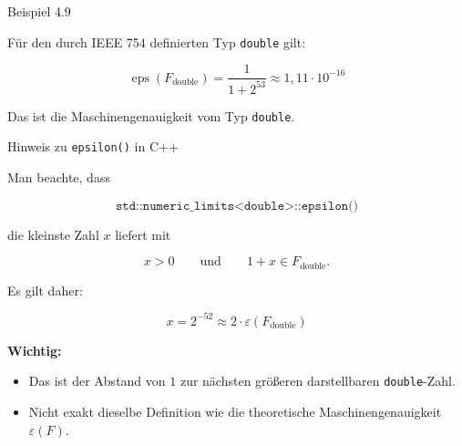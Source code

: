 \documentclass{beamer}
\begin{document}
\begin{frame}{Beispiel 4.9}

\large

Für den durch IEEE 754 definierten Typ \texttt{double} gilt:

\vspace{0.6cm}

\[
\operatorname{eps}(F_{\text{double}})
=
\frac{1}{1+2^{53}}
\approx
1{,}11\cdot 10^{-16}
\]

\vspace{0.6cm}

Das ist die Maschinengenauigkeit vom Typ \texttt{double}.

\end{frame}
\begin{frame}{Hinweis zu \texttt{epsilon()} in C++}

\scriptsize

Man beachte, dass

\[
\texttt{std::numeric\_limits<double>::epsilon()}
\]

die kleinste Zahl \(x\) liefert mit

\[
x>0
\qquad\text{und}\qquad
1+x\in F_{\text{double}}.
\]

\vspace{0.5cm}

Es gilt daher:

\[
x=2^{-52}
\approx
2\cdot \varepsilon(F_{\text{double}})
\]

\vspace{0.6cm}

\textbf{Wichtig:}

\begin{itemize}
\item Das ist der Abstand von \(1\) zur nächsten größeren darstellbaren \texttt{double}-Zahl.
\item Nicht exakt dieselbe Definition wie die theoretische Maschinengenauigkeit \(\varepsilon(F)\).
\end{itemize}

\end{frame}
\end{document}
